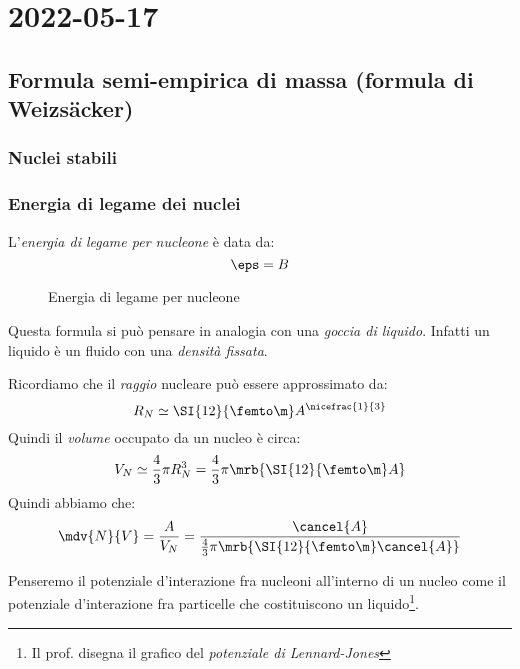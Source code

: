 \chapter{2022-05-17}
\section{Formula semi-empirica di massa (formula di Weizsäcker)}
\subsection{Nuclei stabili}

\subsection{Energia di legame dei nuclei}
L'\textit{energia di legame per nucleone} è data da:
\begin{equation}
	\eps = B
\end{equation}
\begin{figure}[ht]
	\centering
	\caption{Energia di legame per nucleone}
	\label{fig:binding_energy}
\end{figure}


\begin{note}[]
	Questa formula si può pensare in analogia con una \textit{goccia di liquido}.
	Infatti un liquido è un fluido con una \textit{densità fissata}.
\end{note}

Ricordiamo che il \textit{raggio} nucleare può essere approssimato da:
\begin{equation}
	R_N \simeq \SI{12}{\femto\m} A ^{\nicefrac{1}{3}}
\end{equation}
Quindi il \textit{volume} occupato da un nucleo è circa:
\begin{equation}
	V_N \simeq \frac{4}{3} \pi R_N^3 = \frac{4}{3} \pi \mrb{\SI{12}{\femto\m} A}
\end{equation}
Quindi abbiamo che:
\begin{equation}
	\mdv{N}{V} = \frac{A}{V_N} = \frac{\cancel{A}}{\frac{4}{3} \pi
		\mrb{\SI{12}{\femto\m} \cancel{A}}}
\end{equation}

Penseremo il potenziale d'interazione fra nucleoni all'interno di un nucleo
come il potenziale d'interazione fra particelle che costituiscono un
liquido\footnote{
	Il prof. disegna il grafico del \textit{potenziale di Lennard-Jones}
}.

